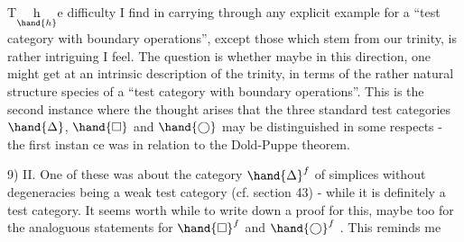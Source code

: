 T\(\underset{\hand{h}}{\text{h}}\)e difficulty I find in carrying through any explicit example
for a ``test category with boundary operations'',  except those which stem
from our trinity,  is rather intriguing I feel.  The question is whether
maybe in this direction,  one might get at an intrinsic description of
the trinity,  in terms of the rather natural structure species of a
``test category with boundary operations''.  This is the second instance
where the thought arises that the three standard test categories
$\hand{\Delta}$, $\hand{\square}$ and $\hand{\bigcirc}$ may be distinguished in some respects  -  the first instan
ce was in relation to the Dold-Puppe theorem.

9)  \hand{\uline{\textcolor{black}{Miscellaneous residual questions from part}}} II.  One of these
was about the category $\hand{\Delta}^f$ of  simplices without degeneracies being a
weak test category (cf. section 43)  -  while it is definitely \hand{\uline{\textcolor{black}{not}}} a test
category.  It seems worth while to write down a proof for this,  maybe
too for the analoguous statements for $\hand{\square}^f$  and $\hand{\bigcirc}^f$ .  This reminds me

